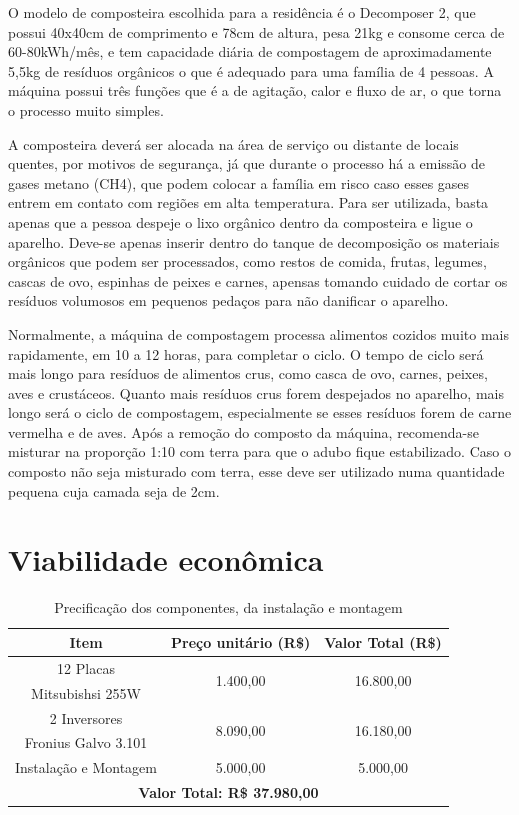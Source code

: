 O modelo de composteira escolhida para a residência é o Decomposer 2, que possui
40x40cm de comprimento e 78cm de altura, pesa 21kg e consome cerca de 60-80kWh/mês, e
tem capacidade diária de compostagem de aproximadamente 5,5kg de resíduos orgânicos o que
é adequado para uma família de 4 pessoas. A máquina possui três funções que é a de agitação,
calor e fluxo de ar, o que torna o processo muito simples.

A composteira deverá ser alocada na área de serviço ou distante de locais quentes, por
motivos de segurança, já que durante o processo há a emissão de gases metano (CH4), que
podem colocar a família em risco caso esses gases entrem em contato com regiões em alta
temperatura. Para ser utilizada, basta apenas que a pessoa despeje o lixo orgânico dentro da
composteira e ligue o aparelho. Deve-se apenas inserir dentro do tanque de decomposição os
materiais orgânicos que podem ser processados, como restos de comida, frutas, legumes, cascas
de ovo, espinhas de peixes e carnes, apensas tomando cuidado de cortar os resíduos volumosos
em pequenos pedaços para não danificar o aparelho.

Normalmente, a máquina de compostagem processa alimentos cozidos muito mais
rapidamente, em 10 a 12 horas, para completar o ciclo. O tempo de ciclo será mais longo para
resíduos de alimentos crus, como casca de ovo, carnes, peixes, aves e crustáceos. Quanto mais
resíduos crus forem despejados no aparelho, mais longo será o ciclo de compostagem,
especialmente se esses resíduos forem de carne vermelha e de aves.
Após a remoção do composto da máquina, recomenda-se misturar na proporção 1:10 com
terra para que o adubo fique estabilizado. Caso o composto não seja misturado com terra,
esse deve ser utilizado numa quantidade pequena cuja camada seja de 2cm.


\section{Viabilidade econômica}

\begin{table}[H]
\centering
\begin{tabular}{|c|c|c|}
\hline 
Item & Preço unitário (R\$) & Valor Total (R\$)\tabularnewline
\hline 
\hline 
12 Placas & \multirow{2}{*}{1.400,00} & \multirow{2}{*}{16.800,00}\tabularnewline
Mitsubishsi 255W &  & \tabularnewline
\hline 
2 Inversores  & \multirow{2}{*}{8.090,00} & \multirow{2}{*}{16.180,00}\tabularnewline
\cline{1-1} 
Fronius Galvo 3.101 &  & \tabularnewline
\hline 
Instalação e Montagem & 5.000,00 & 5.000,00\tabularnewline
\hline 
\multicolumn{3}{|c|}{\textbf{Valor Total: R\$ 37.980,00}}\tabularnewline
\hline 
\end{tabular}
\caption{Precificação dos componentes, da instalação e montagem}
\end{table}

